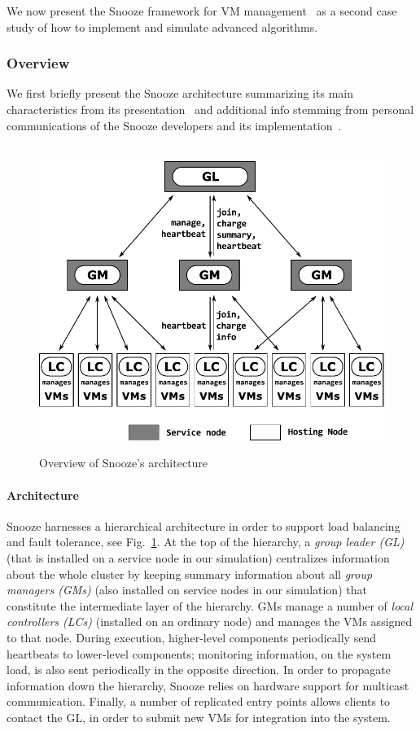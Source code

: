 
We now present the Snooze framework for VM
management~\cite{feller:ccgrid12} as a second case study of how
to implement and simulate advanced algorithms.

\subsubsection{Overview}

We first briefly present the Snooze architecture summarizing its main
characteristics from its presentation~\cite{feller:ccgrid12} and
additional info stemming from personal communications of the Snooze
developers and its implementation~\cite{snoozedev14,snoozeweb}.
\begin{figure}
  {\centering ~\includegraphics[width=.95\linewidth]{figures/snoozearch.pdf}}
  \caption{Overview of Snooze's architecture}
  \label{fig:snoozearch}
\end{figure}

\paragraph{Architecture}

Snooze harnesses a hierarchical architecture in order to support load
balancing and fault tolerance, see Fig.~\ref{fig:snoozearch}. At the
top of the hierarchy, a \emph{group leader (GL)} (that is installed on
a service node in our simulation) centralizes information about the
whole cluster by keeping summary information about all \emph{group
  managers (GMs)} (also installed on service nodes in our simulation)
that constitute the intermediate layer of the hierarchy. GMs manage a
number of \emph{local controllers (LCs)} (installed on an ordinary
node) and manages the VMs assigned to that node. During execution,
higher-level components periodically send heartbeats to lower-level
components; monitoring information, \eg on the system load, is also
sent periodically in the opposite direction. In order to propagate
information down the hierarchy, Snooze relies on hardware support for
multicast communication. Finally, a number of replicated entry points
allows clients to contact the GL, \eg in order to submit new VMs for
integration into the system.

